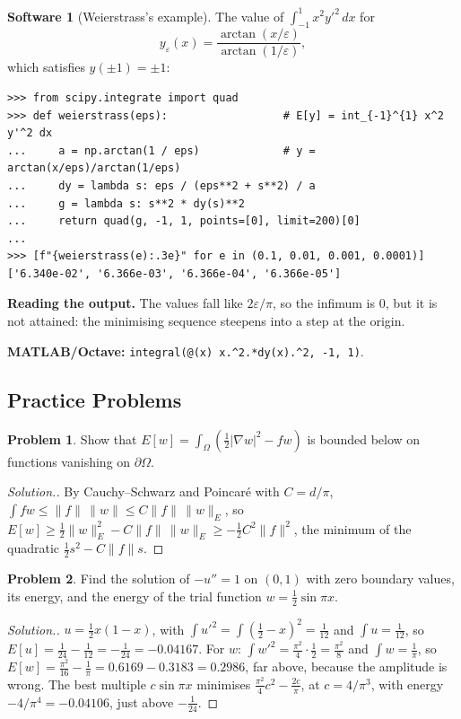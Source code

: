 \documentclass[11pt,a4paper]{article}
\numberwithin{equation}{section}
\theoremstyle{definition}
\newtheorem{software}[thm]{Software}
\newtheorem{problemx}{Problem}[subsection]
\newenvironment{problem}{\begin{problemx}}{\end{problemx}}
\newenvironment{solution}
  {\renewcommand{\qedsymbol}{}\begin{proof}[\textit{Solution}.]}
  {\end{proof}}
\begin{document}
\begin{software}[Weierstrass's example]
\label{sw:weierstrass}
The value of $\int_{-1}^1x^2y'^2\,dx$ for
\[
y_\varepsilon(x) = \frac{\arctan(x/\varepsilon)}{\arctan(1/\varepsilon)} ,
\]
which satisfies $y(\pm1) = \pm1$:
{\small\begin{verbatim}
>>> from scipy.integrate import quad
>>> def weierstrass(eps):                  # E[y] = int_{-1}^{1} x^2 y'^2 dx
...     a = np.arctan(1 / eps)             # y = arctan(x/eps)/arctan(1/eps)
...     dy = lambda s: eps / (eps**2 + s**2) / a
...     g = lambda s: s**2 * dy(s)**2
...     return quad(g, -1, 1, points=[0], limit=200)[0]
...
>>> [f"{weierstrass(e):.3e}" for e in (0.1, 0.01, 0.001, 0.0001)]
['6.340e-02', '6.366e-03', '6.366e-04', '6.366e-05']
\end{verbatim}}
\textbf{Reading the output.} The values fall like $2\varepsilon/\pi$, so the infimum is $0$, but it is not attained: the minimising sequence steepens into a step at the origin.

\textbf{MATLAB/Octave:} \texttt{integral(@(x) x.\^{}2.*dy(x).\^{}2, -1, 1)}.
\end{software}

\subsection{Practice Problems}

\begin{problem}
\label{prob:bounded}
Show that $E[w] = \int_\Omega(\frac12|\nabla w|^2 - fw)$ is bounded below on functions vanishing on $\partial\Omega$.
\end{problem}

\begin{solution}
By Cauchy--Schwarz and Poincar\'e with $C = d/\pi$, $\int fw \leq \|f\|\,\|w\| \leq C\|f\|\,\|w\|_E$, so $E[w] \geq \frac12\|w\|_E^2 - C\|f\|\,\|w\|_E \geq -\frac12C^2\|f\|^2$, the minimum of the quadratic $\frac12s^2 - C\|f\|s$.
\end{solution}

\begin{problem}
Find the solution of $-u'' = 1$ on $(0, 1)$ with zero boundary values, its energy, and the energy of the trial function $w = \frac12\sin\pi x$.
\end{problem}

\begin{solution}
$u = \frac12x(1 - x)$, with $\int u'^2 = \int(\frac12 - x)^2 = \frac1{12}$ and $\int u = \frac1{12}$, so $E[u] = \frac1{24} - \frac1{12} = -\frac1{24} = -0.04167$. For $w$: $\int w'^2 = \frac{\pi^2}4\cdot\frac12 = \frac{\pi^2}8$ and $\int w = \frac1\pi$, so $E[w] = \frac{\pi^2}{16} - \frac1\pi = 0.6169 - 0.3183 = 0.2986$, far above, because the amplitude is wrong. The best
multiple $c\sin\pi x$ minimises $\frac{\pi^2}4c^2 - \frac{2c}\pi$, at $c = 4/\pi^3$, with energy $-4/\pi^4 = -0.04106$, just above $-\frac1{24}$.
\end{solution}
\end{document}

